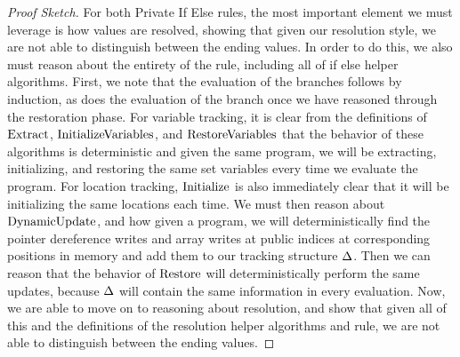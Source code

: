 \begin{proof}[Proof Sketch]
For both Private If Else rules, the most important element we must leverage is how values are resolved, showing that given our resolution style, we are not able to distinguish between the ending values. 
In order to do this, we also must reason about the entirety of the rule, including all of if else helper algorithms. 
First, we note that the evaluation of the  branches follows by induction, as does the evaluation of the  branch once we have reasoned through the restoration phase. 
For variable tracking, it is clear from the definitions of $\mathrm{ Extract}$, $\mathrm{InitializeVariables}$, and $\mathrm{RestoreVariables}$ that the behavior of these algorithms is deterministic and given the same program, we will be extracting, initializing, and restoring the same set variables every time we evaluate the program. For location tracking, $\mathrm{ Initialize}$ is also immediately clear that it will be initializing the same locations each time. We must then reason about $\mathrm{DynamicUpdate}$, and how given a program, we will deterministically find the pointer dereference writes and array writes at public indices at corresponding positions in memory and add them to our tracking structure $\Delta$. Then we can reason that the behavior of $\mathrm{ Restore}$ will deterministically perform the same updates, because $\Delta$ will contain the same information in every evaluation. 
Now, we are able to move on to reasoning about resolution, and show that given all of this and the definitions of the resolution helper algorithms and rule, we are not able to distinguish between the ending values.  


\end{proof}
